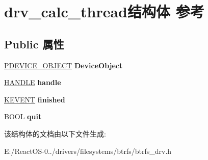 \hypertarget{structdrv__calc__thread}{}\section{drv\+\_\+calc\+\_\+thread结构体 参考}
\label{structdrv__calc__thread}
\subsection*{Public 属性}
\begin{DoxyCompactItemize}
\item 
\mbox{\label{structdrv__calc__thread_abf440456868f2e0ff7b17a81ddbb04ed}} 
\hyperlink{struct___d_e_v_i_c_e___o_b_j_e_c_t}{P\+D\+E\+V\+I\+C\+E\+\_\+\+O\+B\+J\+E\+CT} {\bfseries Device\+Object}
\item 
\mbox{\label{structdrv__calc__thread_aeb78b776436c6dc1c24159fec72cca6b}} 
\hyperlink{interfacevoid}{H\+A\+N\+D\+LE} {\bfseries handle}
\item 
\mbox{\label{structdrv__calc__thread_a744f0dd06f3c9c55e6c4356f055ef8c6}} 
\hyperlink{struct___k_e_v_e_n_t}{K\+E\+V\+E\+NT} {\bfseries finished}
\item 
\mbox{\label{structdrv__calc__thread_a366b6e1f30baaa1a56e8df7466937b46}} 
B\+O\+OL {\bfseries quit}
\end{DoxyCompactItemize}


该结构体的文档由以下文件生成\+:\begin{DoxyCompactItemize}
\item 
E\+:/\+React\+O\+S-\/0../drivers/filesystems/btrfs/btrfs\+\_\+drv.\+h\end{DoxyCompactItemize}
